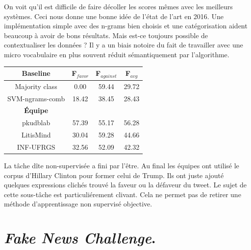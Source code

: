 \documentclass[onecolumn, 12pt]{article}
\begin{document}
On voit qu'il est difficile de faire décoller les scores mêmes avec les meilleurs systèmes.
Ceci nous donne une bonne idée de l'état de l'art en 2016.
Une implémentation simple avec des n-grams bien choisis et une catégorisation aident beaucoup à avoir de bons résultats.
Mais est-ce toujours possible de contextualiser les données ? Il y a un biais notoire du fait de  travailler avec une micro vocabulaire en plus souvent réduit sémantiquement par l'algorithme.
\begin{center}
 \begin{tabular}{| c | c | c || c |}
  \hline
  \textbf{Baseline} & \textbf{F$_{favor}$} & \textbf{F$_{against}$} & \textbf{F$_{avg}$} \\
  \hline
  Majority class    & 0.00                 & 59.44                  & 29.72              \\
  SVM-ngrams-comb   & 18.42                & 38.45                  & 28.43              \\
  \hline
  \textbf{Équipe}  &                      &                        &                    \\
  \hline
  pkudblab          & 57.39                & 55.17                  & 56.28              \\
  LitisMind         & 30.04                & 59.28                  & 44.66              \\
  INF-UFRGS         & 32.56                & 52.09                  & 42.32              \\
  \hline
 \end{tabular}
\end{center}

La tâche dîte non-supervisée a fini par l'être.
Au final les équipes ont utilisé le corpus d'Hillary Clinton pour former celui de Trump.
Ils ont juste ajouté quelques expressions clichés trouvé la faveur ou la défaveur du tweet.
Le sujet de cette sous-tâche est particuliérement clivant.
Cela ne permet pas de retirer une méthode d'apprentissage non supervisé objective.


\section{\textit{Fake News Challenge}.}
\end{document}

